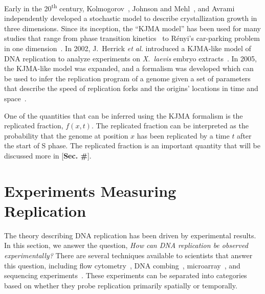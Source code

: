 	Early in the 20\textsuperscript{th} century, Kolmogorov~\cite{Kolmogorov}, Johnson and Mehl~\cite{JohnsonAndMehl}, and Avrami~\cite{AvramiI,AvramiII,AvramiIII} independently developed a stochastic model to describe crystallization growth in three dimensions.
	Since its inception, the ``KJMA model'' has been used for many studies that range from phase transition kinetics~\cite{AlloyPhaseTransitions} to R{\'e}nyi's car-parking problem in one dimension~\cite{CarParking}.
	In 2002, J.~Herrick \emph{et al.} introduced a KJMA-like model of DNA replication to analyze experiments on \emph{X.~laevis} embryo extracts~\cite{KJMA2002}.
	In 2005, the KJMA-like model was expanded, and a formalism was developed which can be used to infer the replication program of a genome given a set of parameters that describe the speed of replication forks and the origins' locations in time and space~\cite{KJMA1, KJMA2}.
	
	One of the quantities that can be inferred using the KJMA formalism is the replicated fraction, $f(x,t)$.
	The replicated fraction can be interpreted as the probability that the genome at position $x$ has been replicated by a time $t$ after the start of S phase.
	The replicated fraction is an important quantity that will be discussed more in [\textbf{Sec. \#}].
	
	
	\section{Experiments Measuring Replication}
	\label{sec:Experiments}
	
	The theory describing DNA replication has been driven by experimental results.
	In this section, we answer the question, \emph{How can DNA replication be observed experimentally?}
	There are several techniques available to scientists that answer this question, including flow cytometry~\cite{DeepSeq}, DNA combing~\cite{DNACombing}, microarray~\cite{MicroarrayReview, McCuneMicroArray}, and sequencing experiments~\cite{StochasticTermination,DeepSeq}.
	These experiments can be separated into categories based on whether they probe replication primarily spatially or temporally.
	
